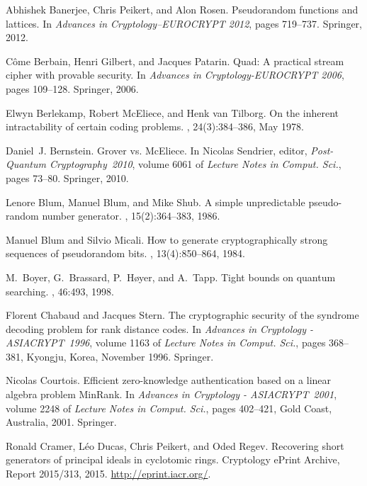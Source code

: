 \documentclass[11pt, a4paper]{llncs}
\begin{document}
\begin{thebibliography}{10}

Abhishek Banerjee, Chris Peikert, and Alon Rosen.
\newblock Pseudorandom functions and lattices.
\newblock In {\em Advances in Cryptology--EUROCRYPT 2012}, pages 719--737.
  Springer, 2012.

C{\^o}me Berbain, Henri Gilbert, and Jacques Patarin.
\newblock Quad: A practical stream cipher with provable security.
\newblock In {\em Advances in Cryptology-EUROCRYPT 2006}, pages 109--128.
  Springer, 2006.

Elwyn Berlekamp, Robert McEliece, and Henk van Tilborg.
\newblock On the inherent intractability of certain coding problems.
, 24(3):384--386, May 1978.

Daniel~J. Bernstein.
\newblock Grover vs. {McEliece}.
\newblock In Nicolas Sendrier, editor, {\em Post-Quantum Cryptography~2010},
  volume 6061 of {\em Lecture Notes in Comput. Sci.}, pages 73--80. Springer,
  2010.

Lenore Blum, Manuel Blum, and Mike Shub.
\newblock A simple unpredictable pseudo-random number generator.
, 15(2):364--383, 1986.

Manuel Blum and Silvio Micali.
\newblock How to generate cryptographically strong sequences of pseudorandom
  bits.
, 13(4):850--864, 1984.

M.~Boyer, G.~Brassard, P.~H{\o}yer, and A.~Tapp.
\newblock Tight bounds on quantum searching.
, 46:493, 1998.

Florent Chabaud and Jacques Stern.
\newblock The cryptographic security of the syndrome decoding problem for rank
  distance codes.
\newblock In {\em Advances in Cryptology - ASIACRYPT~1996}, volume 1163 of {\em
  Lecture Notes in Comput. Sci.}, pages 368--381, Kyongju, Korea, November
  1996. Springer.

Nicolas Courtois.
\newblock Efficient zero-knowledge authentication based on a linear algebra
  problem {MinRank}.
\newblock In {\em Advances in Cryptology - ASIACRYPT~2001}, volume 2248 of {\em
  Lecture Notes in Comput. Sci.}, pages 402--421, Gold Coast, Australia, 2001.
  Springer.

Ronald Cramer, L{\'e}o Ducas, Chris Peikert, and Oded Regev.
\newblock Recovering short generators of principal ideals in cyclotomic rings.
\newblock Cryptology ePrint Archive, Report 2015/313, 2015.
\newblock \url{http://eprint.iacr.org/}.


\end{thebibliography}
\end{document}
